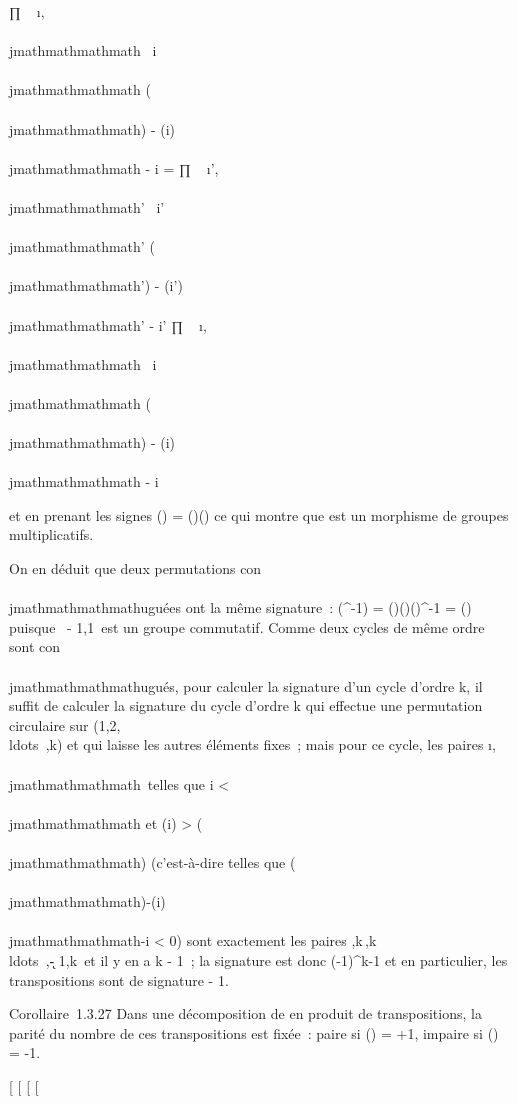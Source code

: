 ∏ ~
\i,\\\\jmathmathmathmath\ \atop
i\neq~\\\\jmathmathmathmath  \sigma\tau(\\\\jmathmathmathmath) - \sigma\tau(i) \over
\\\\jmathmathmathmath - i = ∏ ~
\i',\\\\jmathmathmathmath'\ \atop
i'\neq~\\\\jmathmathmathmath'  \sigma(\\\\jmathmathmathmath') - \sigma(i')
\over \\\\jmathmathmathmath' - i' ∏ ~
\i,\\\\jmathmathmathmath\ \atop
i\neq~\\\\jmathmathmathmath  \tau(\\\\jmathmathmathmath) - \tau(i) \over \\\\jmathmathmathmath
- i

et en prenant les signes \epsilon(\sigma\tau) = \epsilon(\sigma)\epsilon(\tau) ce qui montre que \sigma est un
morphisme de groupes multiplicatifs.

On en déduit que deux permutations con\\\\jmathmathmathmathuguées ont la même signature~:
\epsilon(\tau\sigma\tau^-1) = \epsilon(\tau)\epsilon(\sigma)\epsilon(\tau)^-1 = \epsilon(\sigma) puisque
\ - 1,1\ est un groupe commutatif.
Comme deux cycles de même ordre sont con\\\\jmathmathmathmathugués, pour calculer la
signature d'un cycle d'ordre k, il suffit de calculer la signature du
cycle \sigma d'ordre k qui effectue une permutation circulaire sur
(1,2,\\ldots~,k) et
qui laisse les autres éléments fixes~; mais pour ce cycle, les paires
\i,\\\\jmathmathmathmath\ telles que i \textless{} \\\\jmathmathmathmath et
\sigma(i) \textgreater{} \sigma(\\\\jmathmathmathmath) (c'est-à-dire telles que  \sigma(\\\\jmathmathmathmath)-\sigma(i)
\over \\\\jmathmathmathmath-i \textless{} 0) sont exactement les paires
\1,k\,\2,k\,\\ldots~,\k
- 1,k\ et il y en a k - 1~; la signature est donc
(-1)^k-1 et en particulier, les transpositions sont de
signature - 1.

Corollaire~1.3.27 Dans une décomposition de \sigma en produit de
transpositions, la parité du nombre de ces transpositions est fixée~:
paire si \epsilon(\sigma) = +1, impaire si \epsilon(\sigma) = -1.

{[}
{[}
{[}
{[}
